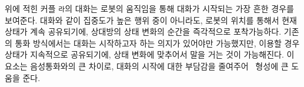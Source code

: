 위에 적힌 커플 \texttt{라}의 대화는 로봇의 움직임을 통해 대화가 시작되는 가장 흔한 경우를 보여준다. 대화와 같이 집중도가 높은 행위 중이 아니라도, 로봇의 위치를 통해서 현재 상태가 계속 공유되기에, 상대방의 상태 변화의 순간을 즉각적으로 포착가능하다. 기존의 통화 방식에서는 대화는 시작하고자 하는 의지가 있어야만 가능했지만, \sysname\을 이용할 경우 상태가 지속적으로 공유되기에, 상태 변화에 맞추어서 말을 거는 것이 가능해진다. 이 요소는 음성 통화와의 큰 차이로, 대화의 시작에 대한 부담감을 줄여주어 \concept\ 형성에 큰 도움을 준다.



